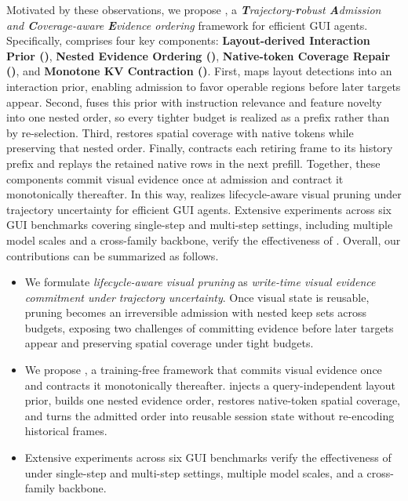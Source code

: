 Motivated by these observations, we propose \textbf{\method{}}, a \emph{\textbf{T}rajectory-\textbf{r}obust \textbf{A}dmission and \textbf{C}overage-aware \textbf{E}vidence ordering} framework for efficient GUI agents.
%
Specifically, \method{} comprises four key components: \textbf{Layout-derived Interaction Prior (\lmp{})}, \textbf{Nested Evidence Ordering (\nwe{})}, \textbf{Native-token Coverage Repair (\awc{})}, and \textbf{Monotone KV Contraction (\kvr{})}.
%
First, \lmp{} maps layout detections into an interaction prior, enabling admission to favor operable regions before later targets appear.
%
Second, \nwe{} fuses this prior with instruction relevance and feature novelty into one nested order, so every tighter budget is realized as a prefix rather than by re-selection.
%
Third, \awc{} restores spatial coverage with native tokens while preserving that nested order.
%
Finally, \kvr{} contracts each retiring frame to its history prefix and replays the retained native rows in the next prefill.
%
Together, these components commit visual evidence once at admission and contract it monotonically thereafter.
%
In this way, \method{} realizes lifecycle-aware visual pruning under trajectory uncertainty for efficient GUI agents.
%
Extensive experiments across six GUI benchmarks covering single-step and multi-step settings, including multiple model scales and a cross-family backbone, verify the effectiveness of \method{}.
%
Overall, our contributions can be summarized as follows.
\begin{itemize}
\item We formulate \emph{lifecycle-aware visual pruning} as \emph{write-time visual evidence commitment under trajectory uncertainty}. Once visual state is reusable, pruning becomes an irreversible admission with nested keep sets across budgets, exposing two challenges of committing evidence before later targets appear and preserving spatial coverage under tight budgets.
\item We propose \method{}, a training-free framework that commits visual evidence once and contracts it monotonically thereafter. \lmp{} injects a query-independent layout prior, \nwe{} builds one nested evidence order, \awc{} restores native-token spatial coverage, and \kvr{} turns the admitted order into reusable session state without re-encoding historical frames.
\item Extensive experiments across six GUI benchmarks verify the effectiveness of \method{} under single-step and multi-step settings, multiple model scales, and a cross-family backbone.
\end{itemize}
